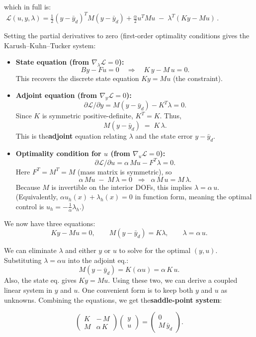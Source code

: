 \documentclass[a4paper,10pt]{article}
\begin{document}
which in full is: \(\; \mathcal{L}(u,y,\lambda) = \frac{1}{2}(y-\bar y_d)^T M (y-\bar y_d) + \frac{\alpha}{2} u^T M u \;-\;\lambda^T(Ky - M u)\,. \)

Setting the partial derivatives to zero (first-order optimality conditions gives the Karush–Kuhn–Tucker system:

\begin{itemize}
	\item \textbf{State equation (from \(\nabla_\lambda \mathcal{L}=0\)):}
	      \[By - Fu = 0 \quad\Longrightarrow\quad K\,y - M\,u = 0.\]
	      This recovers the discrete state equation \(K y = M u\) (the constraint).
	\item \textbf{Adjoint equation (from \(\nabla_y \mathcal{L}=0\)):}
	      \[\partial \mathcal{L}/\partial y = M(y - \bar y_d) - K^T \lambda = 0.\]
	      Since \(K\) is symmetric positive-definite, \(K^T=K\). Thus,
	      \[M(y - \bar y_d) \;=\; K\,\lambda.\]
	      This is the\textbf{adjoint} equation relating \(\lambda\) and the state error \(y-\bar y_d\).

	\item \textbf{Optimality condition for \(u\) (from \(\nabla_u \mathcal{L}=0\)):}
	      \[\partial \mathcal{L}/\partial u = \alpha\, M u - F^T \lambda = 0.\]
	      Here \(F^T=M^T=M\) (mass matrix is symmetric), so
	      \[\alpha\, M u \;-\; M\,\lambda = 0 \;\;\Longrightarrow\;\; \alpha\,M\,u = M\,\lambda.\]
	      Because \(M\) is invertible on the interior DOFs, this implies \(\lambda = \alpha\,u\).  (Equivalently, \(\alpha u_h(x) + \lambda_h(x) = 0\) in function form, meaning the optimal control is \(u_h=-\frac{1}{\alpha}\lambda_h\).)
\end{itemize}

We now have three equations:
\[
	K y - M u = 0, \qquad M(y - \bar y_d) = K\lambda, \qquad \lambda = \alpha\,u.
\]

We can eliminate \(\lambda\) and either \(y\) or \(u\) to solve for the optimal \((y,u)\). Substituting \(\lambda=\alpha u\) into the adjoint eq.:
\[M(y - \bar y_d) = K(\alpha u) = \alpha\,K\,u.\]
Also, the state eq. gives \(K y = M u\). Using these two, we can derive a coupled linear system in \(y\) and \(u\). One convenient form is to keep both \(y\) and \(u\) as unknowns. Combining the equations, we get the\textbf{saddle-point system}:

\[
	\begin{pmatrix} K & -\,M      \\[6pt]
                M & \alpha\,K\end{pmatrix}
	\begin{pmatrix}
		y \\[3pt] u
	\end{pmatrix} =
	\begin{pmatrix}
		0 \\[3pt]
		M\,\bar y_d
	\end{pmatrix}.
\]
\end{document}
